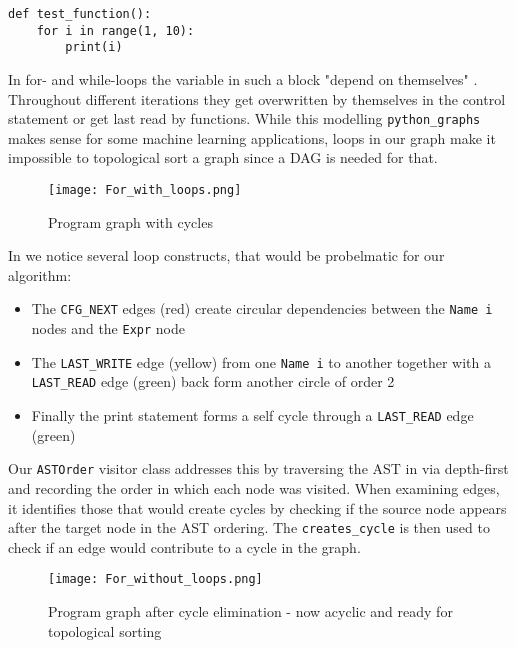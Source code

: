 \documentclass[%
thesis=student,%
coverpage=false,%
titlepage=false,%
headmarks=true, %
english,%
font=libertine, %
math=newpxtx, %
BCOR=5mm,%
coverBCOR=11mm%
]{tum-templates/book/tumbook}
\begin{document}
\begin{lstlisting}[style=pythonstyle, caption={Python for-loop iterating from 1 to 10 and printing each value. This seemingly simple construct creates cycles in the dependency graph because the loop variable \texttt{i} depends on itself across iterations, requiring special handling in our graph construction.}]
def test_function():
    for i in range(1, 10):
        print(i)
\end{lstlisting}


In for- and while-loops the variable in such a block "depend on themselves" . Throughout different iterations they get overwritten by themselves in the control statement or get last read by functions. While this modelling \texttt{python\_graphs} makes sense for some machine learning applications, loops in our graph make it impossible to topological sort a graph since a DAG is needed for that. 

\begin{figure}[htbp]
    \centering
    \texttt{[image: For\_with\_loops.png]}
    \caption{Program graph with cycles}
    \label{fig:For_with_loops}
\end{figure}


In  we notice several loop constructs, that would be probelmatic for our algorithm:
\begin{itemize}
    \item The \texttt{CFG\_NEXT} edges (red) create circular dependencies between the \texttt{Name i} nodes and the \texttt{Expr} node
    \item The \texttt{LAST\_WRITE} edge (yellow) from one \texttt{Name i} to another together with a \texttt{LAST\_READ} edge (green) back form another circle of order 2
    \item Finally the print statement forms a self cycle through a \texttt{LAST\_READ} edge (green)
\end{itemize}

Our \texttt{ASTOrder} visitor class addresses this by traversing the AST in via depth-first and recording the order in which each node was visited. When examining edges, it identifies those that would create cycles by checking if the source node appears after the target node in the AST ordering. The \texttt{creates\_cycle} is then used to check if an edge would contribute to a cycle in the graph.

\begin{figure}[htbp]
    \centering
    \texttt{[image: For\_without\_loops.png]}
    \caption{Program graph after cycle elimination - now acyclic and ready for topological sorting}
    \label{fig:For_without_loops}
\end{figure}
\end{document}

